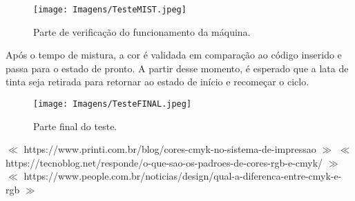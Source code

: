 \documentclass[12pt,a4paper,oneside]{abntex2}
\begin{document}
            \begin{figure}[H]
                \centering
                \texttt{[image: Imagens/TesteMIST.jpeg]}
                \caption{Parte de verificação do funcionamento da máquina.}
                \label{fig:TesteDois}
            \end{figure}

            Após o tempo de mistura, a cor é validada em comparação ao código inserido e passa para o estado de pronto. A partir desse momento, é esperado que a lata de tinta seja retirada para retornar ao estado de início e recomeçar o ciclo.

            \begin{figure}[H]
                \centering
                \texttt{[image: Imagens/TesteFINAL.jpeg]}
                \caption{Parte final do teste.}
                \label{fig:TesteTres}
            \end{figure}

    \begin{thebibliography}{1}
              $\ll$ https://www.printi.com.br/blog/cores-cmyk-no-sistema-de-impressao $\gg$
              $\ll$ https://tecnoblog.net/responde/o-que-sao-os-padroes-de-cores-rgb-e-cmyk/ $\gg$
             $\ll$ https://www.people.com.br/noticias/design/qual-a-diferenca-entre-cmyk-e-rgb $\gg$
	\end{thebibliography}
 
\end{document}
